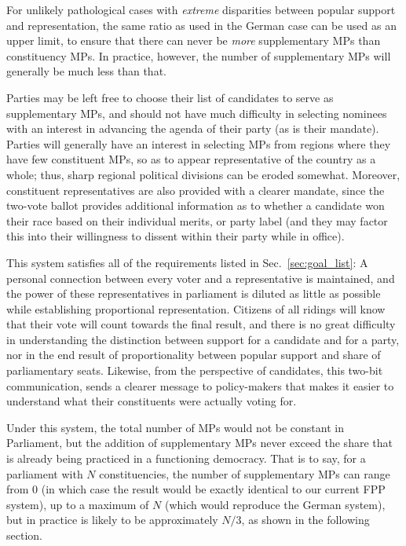 \documentclass[DIV=calc, paper=a4, fontsize=11pt, twocolumn]{scrartcl}	 %
\begin{document}
For unlikely pathological cases with \emph{extreme} disparities between popular support and representation, the same ratio as used in the German case can be used as an upper limit, to ensure that there can never be \emph{more} supplementary MPs than constituency MPs. In practice, however, the number of supplementary MPs will generally be much less than that.

Parties may be left free to choose their list of candidates to serve as supplementary MPs, and should not have much difficulty in selecting nominees with an interest in advancing the agenda of their party (as is their mandate). Parties will generally have an interest in selecting MPs from regions where they have few constituent MPs, so as to appear representative of the country as a whole; thus, sharp regional political divisions can be eroded somewhat.
Moreover, constituent representatives are also provided with a clearer mandate, since the two-vote ballot provides additional information as to whether a candidate won their race based on their individual merits, or party label (and they may factor this into their willingness to dissent within their party while in office).



This system satisfies all of the requirements listed in Sec.~\ref{sec:goal_list}: A personal connection between every voter and a representative is maintained, and the power of these representatives in parliament is diluted as little as possible while establishing proportional representation. 
Citizens of all ridings will know that their vote will count towards the final result, and there is no great difficulty in understanding the  distinction between support for a candidate and for a party, nor in the end result of proportionality between popular support and share of parliamentary seats.
Likewise, from the perspective of candidates, this two-bit communication, sends a clearer message to policy-makers that makes it easier to understand what their constituents were actually voting for.

Under this system, the total number of MPs would not be constant in Parliament, but the addition of supplementary MPs never exceed the share that is already being practiced in a functioning democracy. That is to say, for a parliament with $N$ constituencies, the number of supplementary MPs can range from 0 (in which case the result would be exactly identical to our current FPP system), up to a maximum of $N$ (which would reproduce the German system), but in practice is likely to be approximately $N/3$, as shown in the following section.
\end{document}
